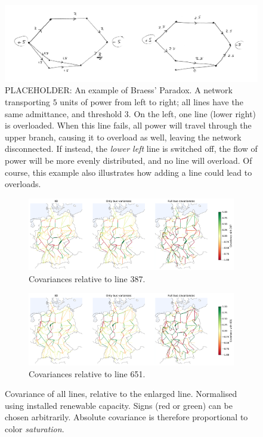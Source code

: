 \documentclass[main.tex]{subfiles}
\begin{document}
\begin{figure}[ht]
\centering
\includegraphics[width=\textwidth]{img/braesstekening.png}
\caption{\label{fig:braess} PLACEHOLDER: An example of Braess' Paradox. A network transporting $5$ units of power from left to right; all lines have the same admittance, and threshold $3$. On the left, one line (lower right) is overloaded. When this line fails, all power will travel through the upper branch, causing it to overload as well, leaving the network disconnected. If instead, the \emph{lower left} line is switched off, the flow of power will be more evenly distributed, and no line will overload. Of course, this example also illustrates how adding a line could lead to overloads.}
\end{figure}

\begin{figure}[ht]
\begin{subfigure}{\textwidth}
    \centering
    \includegraphics[width=\textwidth]{img/flow_correlation_387_iid_and_justvar_and_fullcov.pdf}
    \caption{Covariances relative to line 387.}\label{fig:linecov1}
\end{subfigure}
\begin{subfigure}{\textwidth}
    \centering
    \includegraphics[width=\textwidth]{img/flow_correlation_651_iid_and_justvar_and_fullcov.pdf}
    \caption{Covariances relative to line 651.}\label{fig:linecov2}
\end{subfigure}
    \caption{Covariance of all lines, relative to the enlarged line. Normalised using installed renewable capacity. Signs (red or green) can be chosen arbitrarily. Absolute covariance is therefore proportional to color \emph{saturation}.}
\end{figure}
\end{document}
